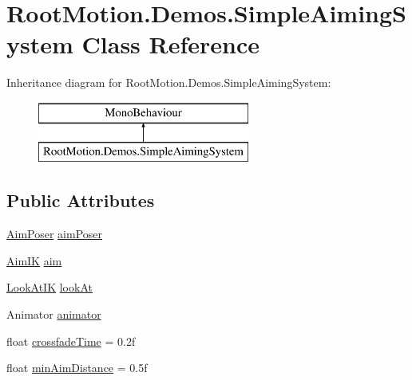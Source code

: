 \hypertarget{class_root_motion_1_1_demos_1_1_simple_aiming_system}{}\section{Root\+Motion.\+Demos.\+Simple\+Aiming\+System Class Reference}
\label{class_root_motion_1_1_demos_1_1_simple_aiming_system}
Inheritance diagram for Root\+Motion.\+Demos.\+Simple\+Aiming\+System\+:\begin{figure}[H]
\begin{center}
\leavevmode
\includegraphics[height=2.000000cm]{class_root_motion_1_1_demos_1_1_simple_aiming_system}
\end{center}
\end{figure}
\subsection*{Public Attributes}
\begin{DoxyCompactItemize}
\item 
\mbox{\hyperlink{class_root_motion_1_1_final_i_k_1_1_aim_poser}{Aim\+Poser}} \mbox{\hyperlink{class_root_motion_1_1_demos_1_1_simple_aiming_system_a920e38dba50d5283216e31c3cb69c5a3}{aim\+Poser}}
\item 
\mbox{\hyperlink{class_root_motion_1_1_final_i_k_1_1_aim_i_k}{Aim\+IK}} \mbox{\hyperlink{class_root_motion_1_1_demos_1_1_simple_aiming_system_a3096bcba7340468122832421ae19058e}{aim}}
\item 
\mbox{\hyperlink{class_root_motion_1_1_final_i_k_1_1_look_at_i_k}{Look\+At\+IK}} \mbox{\hyperlink{class_root_motion_1_1_demos_1_1_simple_aiming_system_a275942b0ade50945b1dbfc1cf5223934}{look\+At}}
\item 
Animator \mbox{\hyperlink{class_root_motion_1_1_demos_1_1_simple_aiming_system_aaf57b2eef51e43eda14d4a2197fc0e82}{animator}}
\item 
float \mbox{\hyperlink{class_root_motion_1_1_demos_1_1_simple_aiming_system_a776891f98173b965912eedc5117be995}{crossfade\+Time}} = 0.\+2f
\item 
float \mbox{\hyperlink{class_root_motion_1_1_demos_1_1_simple_aiming_system_a3c794908e8867d4b4a97c2f049842c73}{min\+Aim\+Distance}} = 0.\+5f
\end{DoxyCompactItemize}


